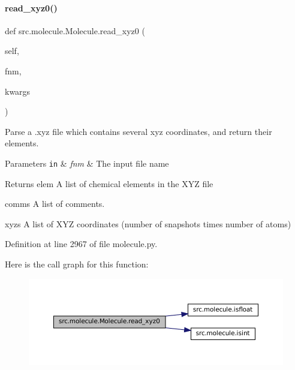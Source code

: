 \paragraph{\texorpdfstring{read\+\_\+xyz0()}{read\_xyz0()}}
{\footnotesize\ttfamily def src.\+molecule.\+Molecule.\+read\+\_\+xyz0 (\begin{DoxyParamCaption}\item[{}]{self,  }\item[{}]{fnm,  }\item[{}]{kwargs }\end{DoxyParamCaption})}



Parse a .xyz file which contains several xyz coordinates, and return their elements. 


\begin{DoxyParams}[1]{Parameters}
\mbox{\tt in}  & {\em fnm} & The input file name \\
\hline
\end{DoxyParams}
\begin{DoxyReturn}{Returns}
elem A list of chemical elements in the X\+YZ file 

comms A list of comments. 

xyzs A list of X\+YZ coordinates (number of snapshots times number of atoms) 
\end{DoxyReturn}


Definition at line 2967 of file molecule.\+py.

Here is the call graph for this function\+:
\nopagebreak
\begin{figure}[H]
\begin{center}
\leavevmode
\includegraphics[width=350pt]{classsrc_1_1molecule_1_1Molecule_a4b84ec657b8c89c34674bb205f7eb1b2_cgraph}
\end{center}
\end{figure}
\mbox{\label{classsrc_1_1molecule_1_1Molecule_a029c994fba2c8388259bd062def28fde}} 
